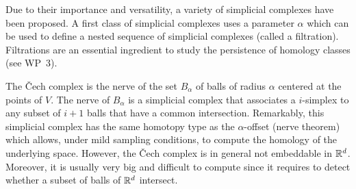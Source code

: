 


Due to their importance and versatility, a variety of simplicial complexes have been proposed. A first class of simplicial complexes uses a parameter $\alpha$ which can be used to define a nested sequence of simplicial complexes (called a filtration). Filtrations are an essential ingredient to study the persistence of homology classes (see WP~3).

The \v{C}ech complex is the nerve of the set $B_{\alpha}$ of balls of
radius $\alpha$ centered at the points of $V$. The nerve of
$B_{\alpha}$  is a simplicial complex that associates a
$i$-simplex to any subset of $i+1$ balls that have a common
intersection. Remarkably, this simplicial
complex  has the same homotopy type as the $\alpha$-offset (nerve theorem) which allows,  under mild sampling conditions, to compute the homology of the underlying space. However,
the \v{C}ech complex is in general not embeddable in $\mathbb R ^d$. Moreover, it is usually very big and
difficult to compute since it requires to detect whether a subset of
balls of  $\mathbb R ^d$ intersect. 

